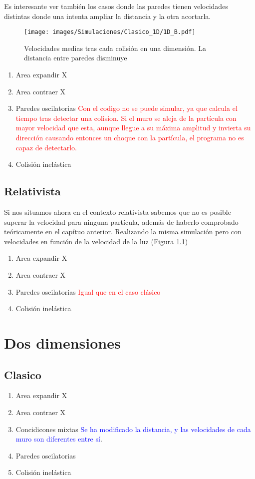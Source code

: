 \documentclass[11pt, spanish]{book}
\begin{document}
Es interesante ver también los casos donde las paredes tienen velocidades distintas donde una intenta ampliar la distancia y la otra acortarla. 

\begin{figure}[H]
    \centering
    \texttt{[image: images/Simulaciones/Clasico\_1D/1D\_B.pdf]}
    \caption{Velocidades medias tras cada colisión en una dimensión. La distancia entre paredes disminuye}
    \label{fig:1D_B}
\end{figure}
\begin{enumerate}
    \item Area expandir X
    \item Area contraer X
    \item  Paredes oscilatorias \textcolor{red}{Con el codigo no se puede simular, ya que calcula el tiempo tras detectar una colision. Si el muro se aleja de la partícula con mayor velocidad que esta, aunque llegue a su máxima amplitud y invierta su dirección causando entonces un choque con la partícula, el programa no es capaz de detectarlo.}
    \item Colisión inelástica
\end{enumerate}
\subsection{Relativista}

Si nos situamos ahora en el contexto relativista sabemos que no es posible superar la velocidad para ninguna partícula, además de haberlo comprobado teóricamente en el capítuo anterior. Realizando la misma simulación pero con velocidades en función de la velocidad de la luz (Figura \ref{})

\begin{enumerate}
    \item Area expandir X
    \item Area contraer X
    \item  Paredes oscilatorias \textcolor{red}{Igual que en el caso clásico}
    \item Colisión inelástica
\end{enumerate}
\section{Dos dimensiones}

\subsection{Clasico}
\begin{enumerate}
    \item Area expandir X
    \item Area contraer X
    \item Concidicones mixtas \textcolor{blue}{Se ha modificado la distancia, y las velocidades de cada muro son diferentes entre sí}.
    \item Paredes oscilatorias
    \item Colisión inelástica
\end{enumerate}
\end{document}
